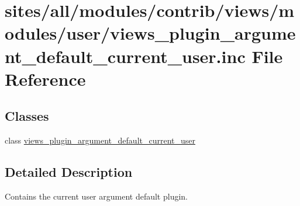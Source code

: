 \hypertarget{views__plugin__argument__default__current__user_8inc}{
\section{sites/all/modules/contrib/views/modules/user/views\_\-plugin\_\-argument\_\-default\_\-current\_\-user.inc File Reference}
\label{views__plugin__argument__default__current__user_8inc}
}
\subsection*{Classes}
\begin{CompactItemize}
\item 
class \hyperlink{classviews__plugin__argument__default__current__user}{views\_\-plugin\_\-argument\_\-default\_\-current\_\-user}
\end{CompactItemize}


\subsection{Detailed Description}
Contains the current user argument default plugin. 